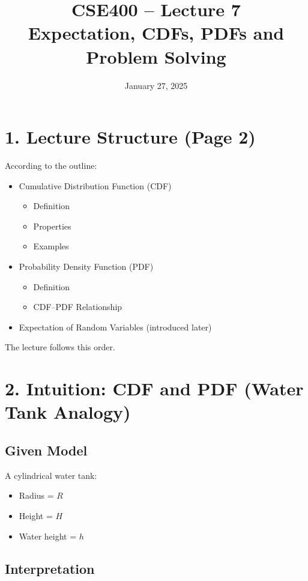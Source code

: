 \documentclass[12pt]{article}
\title{\textbf{CSE400 -- Lecture 7}\\
Expectation, CDFs, PDFs and Problem Solving}
\date{January 27, 2025}
\begin{document}
\maketitle

\section*{1. Lecture Structure (Page 2)}

According to the outline:

\begin{itemize}
\item Cumulative Distribution Function (CDF)
\begin{itemize}
\item Definition
\item Properties
\item Examples
\end{itemize}

\item Probability Density Function (PDF)
\begin{itemize}
\item Definition
\item CDF--PDF Relationship
\end{itemize}

\item Expectation of Random Variables (introduced later)
\end{itemize}

The lecture follows this order.

\section*{2. Intuition: CDF and PDF (Water Tank Analogy)}

\subsection*{Given Model}

A cylindrical water tank:

\begin{itemize}
\item Radius = $R$
\item Height = $H$
\item Water height = $h$
\end{itemize}

\subsection*{Interpretation}
\end{document}
